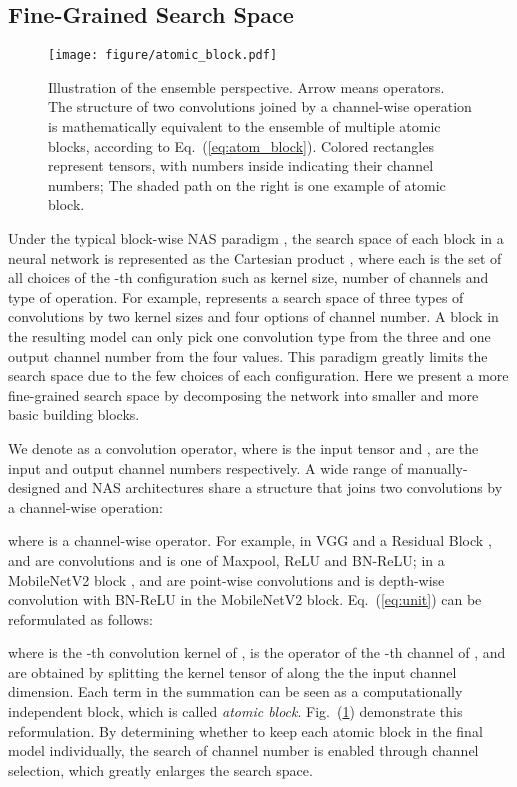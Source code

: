 \documentclass{article} \usepackage{iclr2020_conference,times}
\begin{document}
\subsection{Fine-Grained Search Space}
\label{sec:fine_grained_search_space}

\begin{figure}[btp]
    \centering
    \texttt{[image: figure/atomic\_block.pdf]}
    \caption{Illustration of the ensemble perspective. Arrow means operators. The structure of two convolutions joined by a channel-wise operation is mathematically equivalent to the ensemble of multiple atomic blocks, according to Eq.~(\ref{eq:atom_block}). Colored rectangles represent tensors, with numbers inside indicating their channel numbers; The shaded path on the right is one example of atomic block.} \label{fig:rethink_inverted_residual}
\end{figure}
Under the typical block-wise NAS paradigm \citep{tan2019mnasnet,tan2019mixnet}, the search space of each block in a neural network is represented as the Cartesian product , where each  is the set of all choices of the -th configuration such as kernel size, number of channels and type of operation. For example,  represents a search space of three types of convolutions by two kernel sizes and four options of channel number. A block in the resulting model can only pick one convolution type from the three and one output channel number from the four values. This paradigm greatly limits the search space due to the few choices of each configuration. Here we present a more fine-grained search space by decomposing the network into smaller and more basic building blocks.


We denote  as a convolution operator, where  is the input tensor and ,  are the input and output channel numbers respectively. A wide range of manually-designed and NAS architectures share a structure that joins two convolutions by a channel-wise operation:



where  is a channel-wise operator. For example, in VGG \citep{simonyan2015vgg} and a Residual Block \citep{he2016resnet},  and  are convolutions and  is one of Maxpool, ReLU and BN-ReLU; in a MobileNetV2 block \citep{sandler2018mobilenetv2},  and  are point-wise convolutions and  is depth-wise convolution with BN-ReLU in the MobileNetV2 block.
Eq.~(\ref{eq:unit}) can be reformulated as follows:

where  is the -th convolution kernel of ,  is the operator of the -th channel of , and  are obtained by splitting the kernel tensor of  along the the input channel dimension. Each term in the summation can be seen as a computationally independent block, which is called {\it atomic block}. Fig.~(\ref{fig:rethink_inverted_residual}) demonstrate this reformulation. By determining whether to keep each atomic block in the final model individually, the search of channel number  is enabled through channel selection, which greatly enlarges the search space. 
\end{document}
